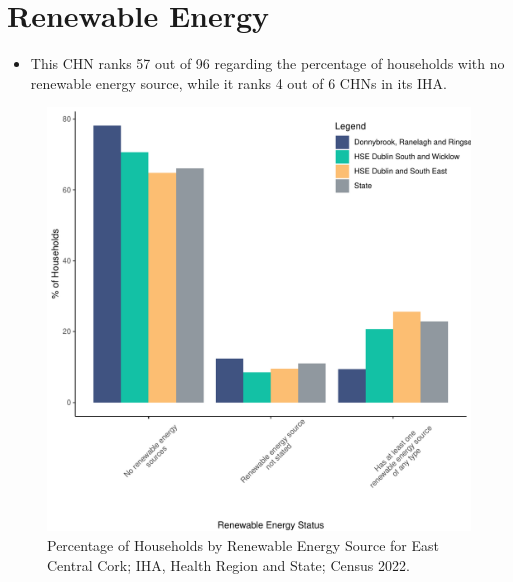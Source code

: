 \documentclass{article}
\begin{document}
\section{Renewable Energy}\label{sect:RE}
\begin{itemize}
\item This CHN ranks  57 out of 96 regarding the percentage of households with no renewable energy source, while it ranks   4 out of 6 CHNs in its IHA.
\end{itemize}
\begin{figure}[H]
	\centering
	\includegraphics[width = 140mm]{../figures/RenewableEnergyED.pdf}
	\caption{Percentage of Households by Renewable Energy Source for East Central Cork; IHA, Health Region and State; Census 2022.}
	\label{fig:vbnv}
	\end{figure}
\end{document}
